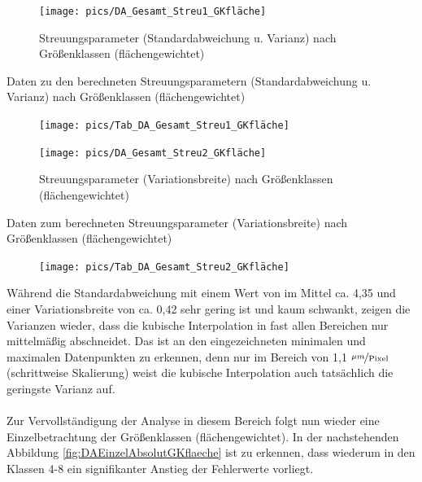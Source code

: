 \documentclass[
fontsize=10pt, 
listof = totoc,
parskip = half	
]{report}
\begin{document}
\begin{figure}[H]
	\centering
	\texttt{[image: pics/DA\_Gesamt\_Streu1\_GKfläche]}
	\caption{Streuungsparameter (Standardabweichung u. Varianz) nach Größenklassen (flächengewichtet)}
	\label{fig:DAGesamtStreu1GKfläche}
\end{figure}

\begin{table}[H]
	\caption{Daten zu den berechneten Streuungsparametern (Standardabweichung u. Varianz) nach Größenklassen (flächengewichtet)}
	\label{tab:DAGesamtStreu1GKflaeche}
	\begin{figure}[H]
		\centering
		\texttt{[image: pics/Tab\_DA\_Gesamt\_Streu1\_GKfläche]}
	\end{figure}
\end{table}

\begin{figure}[H]
	\centering
	\texttt{[image: pics/DA\_Gesamt\_Streu2\_GKfläche]}
	\caption{Streuungsparameter (Variationsbreite) nach Größenklassen (flächengewichtet)}
	\label{fig:DAGesamtStreu2GKfläche}
\end{figure}

\begin{table}[H]
	\caption{Daten zum berechneten Streuungsparameter (Variationsbreite) nach Größenklassen (flächengewichtet)}
	\label{tab:DAGesamtStreu2GKflaeche}
	\begin{figure}[H]
		\centering
		\texttt{[image: pics/Tab\_DA\_Gesamt\_Streu2\_GKfläche]}
	\end{figure}
\end{table}

\noindent Während die Standardabweichung mit einem Wert von im Mittel ca. 4,35 und einer Variationsbreite von ca. 0,42 sehr gering ist und kaum schwankt, zeigen die Varianzen wieder, dass die kubische Interpolation in fast allen Bereichen nur mittelmäßig abschneidet. Das ist an den eingezeichneten minimalen und maximalen Datenpunkten zu erkennen, denn nur im Bereich von 1,1 $\nicefrac{\mu m}{\text{Pixel}}$ (schrittweise Skalierung) weist die kubische Interpolation auch tatsächlich die geringste Varianz auf.
\\\\
\noindent Zur Vervollständigung der Analyse in diesem Bereich folgt nun wieder eine Einzelbetrachtung der Größenklassen (flächengewichtet). In der nachstehenden Abbildung \ref{fig:DAEinzelAbsolutGKflaeche} ist zu erkennen, dass wiederum in den Klassen 4-8 ein signifikanter Anstieg der Fehlerwerte vorliegt.
\end{document}
